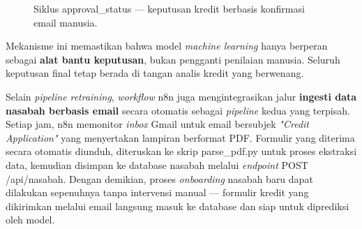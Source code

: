 \begin{figure}[H]
\centering
{}
\caption{Siklus approval\_status --- keputusan kredit berbasis konfirmasi email manusia.}
\label{fig:hitl-flow}
\end{figure}

Mekanisme ini memastikan bahwa model \textit{machine learning} hanya berperan sebagai \textbf{alat bantu keputusan}, bukan pengganti penilaian manusia. Seluruh keputusan final tetap berada di tangan analis kredit yang berwenang.



Selain \textit{pipeline} \textit{retraining}, \textit{workflow} n8n juga mengintegrasikan jalur \textbf{ingesti data nasabah berbasis email} secara otomatis sebagai \textit{pipeline} kedua yang terpisah. Setiap jam, n8n memonitor \textit{inbox} Gmail untuk email bersubjek \textit{"Credit Application"} yang menyertakan lampiran berformat PDF. Formulir yang diterima secara otomatis diunduh, diteruskan ke skrip parse\_pdf.py untuk proses ekstraksi data, kemudian disimpan ke database nasabah melalui \textit{endpoint} POST /api/nasabah. Dengan demikian, proses \textit{onboarding} nasabah baru dapat dilakukan sepenuhnya tanpa intervensi manual --- formulir kredit yang dikirimkan melalui email langsung masuk ke database dan siap untuk diprediksi oleh model.

